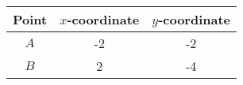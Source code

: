 \begin{tabular}{|c|c|c|}
	\hline
	\textbf{Point} & \textbf{$x$-coordinate} & \textbf{$y$-coordinate}\\
	\hline
	$A$ & -2 & -2\\ 
	\hline
	$B$ & 2 & -4\\
	\hline
\end{tabular}
